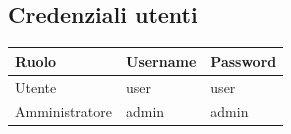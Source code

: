 \documentclass[a4paper, 12pt]{article}
\begin{document}
\begin{titlepage}
\renewcommand{\arraystretch}{1.5} %

\section*{\centering Credenziali utenti}
\begin{center}
\begin{longtable}{|l|l|l|}
\hline
\rowcolor[HTML]{094074}
{\color[HTML]{FFFFFF} Ruolo} & {\color[HTML]{FFFFFF} Username} & {\color[HTML]{FFFFFF} Password}\\
\hline
Utente & user & user\\
\hline
Amministratore & admin & admin\\
\hline
\end{longtable}
\end{center}

\end{titlepage}

\newpage

\begingroup
\setlength{\baselineskip}{1.5\baselineskip} %
\tableofcontents
\endgroup

\newpage
\end{document}
